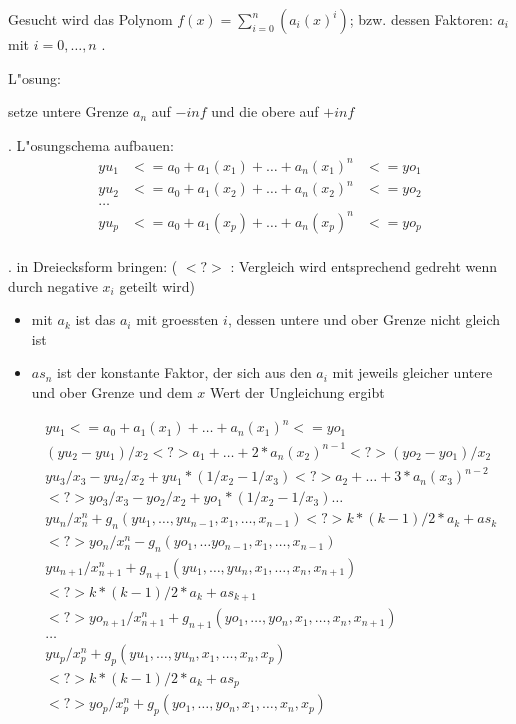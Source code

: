 \bigskip\noindent
Gesucht wird das Polynom $f(x) = \sum_{i=0}^{n} (a_i( x )^i)$; bzw. dessen Faktoren: $a_i$ mit $i=0, \ldots, n$ .

\bigskip\noindent
L"osung:

setze untere Grenze $a_n$ auf  $-inf$ und die obere auf $+inf$

\bigskip{}. L"osungschema aufbauen:
\begin{eqnarray*}
yu_1 &<=  a_0 + a_1( x_1 ) + \ldots + a_n( x_1 )^n &<= yo_1\\
yu_2 &<=  a_0 + a_1( x_2 ) + \ldots + a_n( x_2 )^n &<= yo_2\\
\ldots & & \\
yu_p &<=  a_0 + a_1( x_p ) + \ldots + a_n( x_p )^n &<= yo_p\\
\end{eqnarray*}

\bigskip{}. in Dreiecksform bringen:
( $<?>$ : Vergleich wird entsprechend gedreht wenn durch negative $x_i$ geteilt wird)

\begin{itemize}
 \item mit $a_k$ ist das $a_i$ mit groessten $i$, dessen untere und ober Grenze nicht gleich ist 
 \item $as_{n}$ ist der konstante Faktor, der sich aus den $a_i$ mit jeweils gleicher untere und ober Grenze und dem $x$ Wert der Ungleichung ergibt
\end{itemize}

\begin{eqnarray*}
&&yu_1 <= a_0 + a_1( x_1 ) + \ldots + a_n( x_1 )^n <= yo_1\\
&&(yu_2 - yu_1)/x_2 <?> a_1 + \ldots + 2* a_n( x_2 )^{n-1} <?> (yo_2-yo_1)/x_2\\
&&yu_3 /x_3 - yu_2/x_2 + yu_1*(1/x_2-1/x_3) <?> a_2 + \ldots + 3 * a_n( x_3 )^{n-2} \\
&&  <?> yo_3/x_3 - yo_2/x_2 + yo_1*(1/x_2-1/x_3) \ldots \\
&&  yu_n / x_n^n + g_n( yu_1,\ldots, yu_{n-1}, x_1, \ldots, x_{n-1}) <?>  k*(k-1)/2 * a_k + as_{k}\\
&&  <?> yo_n / x_n^n - g_n( yo_1, \ldots yo_{n-1}, x_1, \ldots, x_{n-1}) \\
&&yu_{n+1} / x_{n+1}^n + g_{n+1}( yu_1, \ldots, yu_{n}, x_1,\ldots, x_n, x_{n+1})\\
&&  <?> k*(k-1)/2 * a_{k} + as_{k+1} \\
&&  <?> yo_{n+1} / x_{n+1}^n + g_{n+1}( yo_1, \ldots, yo_{n}, x_1, \ldots, x_n, x_{n+1})\\
&&\ldots\\
&&yu_p / x_p^n + g_p( yu_1, \ldots, yu_{n}, x_1, \ldots, x_n, x_p) \\
&&  <?> k*(k-1)/2 *  a_k  + as_{p} \\
&&  <?> yo_p / x_p^n + g_p( yo_1, \ldots, yo_{n}, x_1, \ldots, x_n, x_p)\\
\end{eqnarray*}


